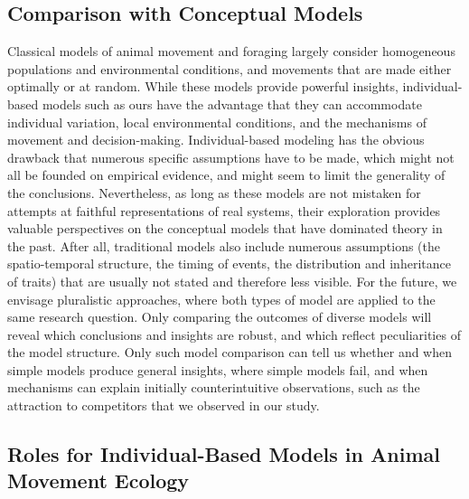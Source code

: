 {\subsection*{Comparison with Conceptual Models}

Classical models of animal movement and foraging largely consider homogeneous populations and environmental conditions, and movements that are made either optimally or at random.
While these models provide powerful insights, 
individual-based models such as ours have the advantage that they can accommodate individual variation, local environmental conditions, and the mechanisms of movement and decision-making.
Individual-based modeling has the obvious drawback that numerous specific assumptions have to be made, which might not all be founded on empirical evidence, and might seem to limit the generality of the conclusions. 
Nevertheless, as long as these models are not mistaken for attempts at faithful representations of real systems, their exploration provides valuable perspectives on the conceptual models that have dominated theory in the past. 
After all, traditional models also include numerous assumptions (the spatio-temporal structure, the timing of events, the distribution and inheritance of traits) that are usually not stated and therefore less visible.
For the future, we envisage pluralistic approaches, where both types of model are applied to the same research question. 
Only comparing the outcomes of diverse models will reveal which conclusions and insights are robust, and which reflect peculiarities of the model structure.
Only such model comparison can tell us whether and when simple models produce general insights, where simple models fail, and when mechanisms can explain initially counterintuitive observations, such as the attraction to competitors that we observed in our study.

\subsection*{Roles for Individual-Based Models in Animal Movement Ecology}

}
